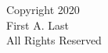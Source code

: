 \doublespacing
\newpage
\mbox{}
\thispagestyle{empty}
\vfill

\begin{center}

	Copyright 2020 \\
	First A. Last \\
	All Rights Reserved
\end{center}